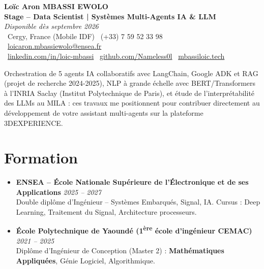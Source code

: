 \documentclass[a4paper,11pt]{article}
\begin{document}
\begin{center}
    {\Large \textbf{Loïc Aron MBASSI EWOLO}} \\ \vspace{4pt}
    \textbf{\large Stage -- Data Scientist | Systèmes Multi-Agents IA \& LLM} \\
    \textit{\small Disponible dès septembre 2026} \\ \vspace{4pt}
    \small
    \faMapMarker\ Cergy, France (Mobile IDF) \quad
    \faPhone\ (+33) 7 59 52 33 98 \quad
    \faEnvelope\ \href{mailto:loicaron.mbassiewolo@ensea.fr}{loicaron.mbassiewolo@ensea.fr} \\ \vspace{2pt}
    \faLinkedin\ \href{https://www.linkedin.com/in/loic-mbassi/}{linkedin.com/in/loic-mbassi} \quad
    \faGithub\ \href{https://github.com/Nameless0l}{github.com/Nameless0l} \quad
    \faGlobe\ \href{https://mbassiloic.tech}{mbassiloic.tech}
\end{center}

\vspace{-6pt}

\noindent\small{Orchestration de 5 agents IA collaboratifs avec LangChain, Google ADK et RAG (projet de recherche 2024-2025), NLP à grande échelle avec BERT/Transformers à l'INRIA Saclay (Institut Polytechnique de Paris), et étude de l'interprétabilité des LLMs au MILA : ces travaux me positionnent pour contribuer directement au développement de votre assistant multi-agents sur la plateforme 3DEXPERIENCE.}

\section{Formation}
\begin{itemize}[leftmargin=*, label=\tiny$\bullet$, nosep]
    \item \textbf{ENSEA -- École Nationale Supérieure de l'Électronique et de ses Applications} \hfill \textit{2025 -- 2027} \\
    \small{Double diplôme d'Ingénieur -- Systèmes Embarqués, Signal, IA. Cursus : Deep Learning, Traitement du Signal, Architecture processeurs.}
    \item \textbf{École Polytechnique de Yaoundé (1\textsuperscript{ère} école d'ingénieur CEMAC)} \hfill \textit{2021 -- 2025} \\
    \small{Diplôme d'Ingénieur de Conception (Master 2) : \textbf{Mathématiques Appliquées}, Génie Logiciel, Algorithmique.}
\end{itemize}
\end{document}
